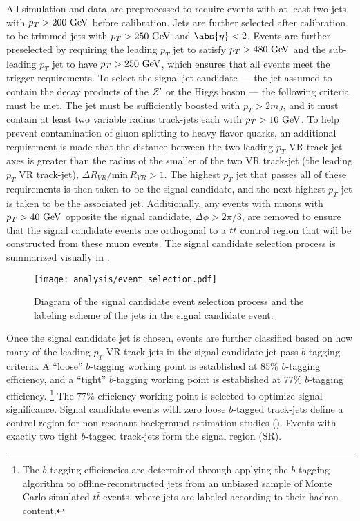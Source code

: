All simulation and data are preprocessed to require events with at least two \largeR{} jets with $p_{T} > 200~\mathrm{GeV}$ before calibration.
Jets are further selected after calibration to be trimmed \largeR{} jets with $p_{T} > 250~\mathrm{GeV}$ and $\abs{\eta} < 2$.
Events are further preselected by requiring the leading $p_{T}$ \largeR{} jet to satisfy $p_{T} > 480~\mathrm{GeV}$ and the sub-leading $p_{T}$ \largeR{} jet to have $p_{T} > 250~\mathrm{GeV}$, which ensures that all events meet the trigger requirements.
To select the signal jet candidate --- the \largeR{} jet assumed to contain the decay products of the $Z^{\prime}$ or the Higgs boson --- the following criteria must be met.
The \largeR{} jet must be sufficiently boosted with $p_{T} > 2m_{J}$, and it must contain at least two variable radius track-jets each with $p_{T} > 10~\mathrm{GeV}$.
To help prevent contamination of gluon splitting to heavy flavor quarks, an additional requirement is made that the distance between the two leading $p_{T}$ VR track-jet axes is greater than the radius of the smaller of the two VR track-jet (the leading $p_{T}$ VR track-jet), $\Delta R_{VR}/\mathrm{min\,} R_{VR} > 1$.
The highest $p_{T}$ \largeR{} jet that passes all of these requirements is then taken to be the signal candidate, and the next highest $p_{T}$ \largeR{} jet is taken to be the associated jet.
Additionally, any events with muons with $p_{T} > 40~\mathrm{GeV}$ opposite the signal candidate, $\Delta \phi > 2\pi/3$, are removed to ensure that the signal candidate events are orthogonal to a $t\bar{t}$ control region that will be constructed from these muon events.
The signal candidate selection process is summarized visually in .

\begin{figure}[htbp]
 \centering
 \texttt{[image: analysis/event\_selection.pdf]}
 \caption[Diagram of the signal candidate event selection process.]{%
  Diagram of the signal candidate event selection process and the labeling scheme of the \largeR{} jets in the signal candidate event.}
 \label{fig:event_selection}
\end{figure}

Once the signal candidate jet is chosen, events are further classified based on how many of the leading $p_{T}$ VR track-jets in the signal candidate \largeR{} jet pass $b$-tagging criteria.
A ``loose'' $b$-tagging working point is established at $85\%$ $b$-tagging efficiency, and a ``tight'' $b$-tagging working point is established at $77\%$ $b$-tagging efficiency.%
\footnote{The $b$-tagging efficiencies are determined through applying the $b$-tagging algorithm to offline-reconstructed jets from an unbiased sample of Monte Carlo simulated $t\bar{t}$ events, where jets are labeled according to their hadron content.}
The $77\%$ efficiency working point is selected to optimize signal significance.
Signal candidate events with zero loose $b$-tagged track-jets define a control region for non-resonant background estimation studies (\CRQCD).
Events with exactly two tight $b$-tagged track-jets form the signal region (SR).


